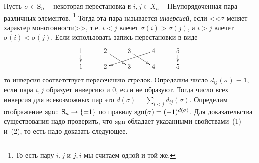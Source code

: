 Пусть $\sigma \in\operatorname{S}_{n}$ -- некоторая перестановка и $i,j\in X_n$ -- НЕупорядоченная пара различных элементов.%
\footnote{То есть пару $i, j$ и $j, i$ мы считаем одной и той же.}
Тогда эта пара называется {\it инверсией}, если <<$\sigma$ меняет характер монотонности>>, т.е. $i<j$ влечет $\sigma(i)>\sigma(j)$, а $i>j$ влечет $\sigma(i)<\sigma(j)$.
Если использовать запись перестановки в виде
\[
\xymatrix@R=10pt{
	{1}\ar[d]&{2}\ar[dr]&{3}\ar[dr]&{4}\ar[dll]&{5}\ar[d]\\
	{1}&{2}&{3}&{4}&{5}
}
\]
то инверсия соответствует пересечению стрелок.
Определим число $d_{ij}(\sigma) = 1$, если пара $i, j$ образует инверсию и $0$, если не образуют.
Тогда число всех инверсия для всевозможных пар это $d(\sigma) = \sum_{i < j} d_{ij}(\sigma)$.
Определим отображение $\operatorname{sgn}\colon \operatorname{S}_{n}\to \{\pm 1\}$ по правилу $\operatorname{sgn}(\sigma) = (-1)^{d(\sigma)}$.
Для доказательства существования надо проверить, что $\operatorname{sgn}$ обладает указанными свойствами~(1) и~(2), то есть надо доказать следующее.

